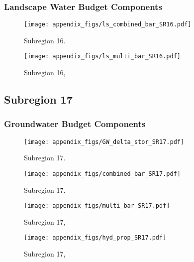 \subsubsection{Landscape Water Budget Components}
\begin{figure}[ht]
\centerline{\texttt{[image: appendix\_figs/ls\_combined\_bar\_SR16.pdf]}}
\caption{\LSCombinedTextOne Subregion 16.\LSCombinedTextTwo}
\label{fig:LS_budget_SR16}
\end{figure}
\newpage

\begin{landscape}
\begin{figure}[ht]
\centerline{\texttt{[image: appendix\_figs/ls\_multi\_bar\_SR16.pdf]}}
\caption{\LSMultiTextOne Subregion 16,\LSMultiTextTwo}
\label{fig:multi_LS_budget_SR16}
\end{figure}
\newpage
\end{landscape}

\subsection{Subregion 17}
\subsubsection{Groundwater Budget Components}
\begin{figure}[h]
\centerline{\texttt{[image: appendix\_figs/GW\_delta\_stor\_SR17.pdf]}}
\caption{\GWBudgetText Subregion 17.}
\label{fig:delta_stor_SR17}
\end{figure}
\newpage

\begin{figure}[ht]
\centerline{\texttt{[image: appendix\_figs/combined\_bar\_SR17.pdf]}}
\caption{\GWCombinedTextOne Subregion 17.\GWCombinedTextTwo}
\label{fig:GW_budget_SR17}
\end{figure}
\newpage

\begin{landscape}
\begin{figure}[ht]
\centerline{\texttt{[image: appendix\_figs/multi\_bar\_SR17.pdf]}}
\caption{\GWMultiTextOne Subregion 17,\GWMultiTextTwo}
\label{fig:multi_GW_budget_SR17}
\end{figure}
\newpage

\begin{figure}[ht]
\centerline{\texttt{[image: appendix\_figs/hyd\_prop\_SR17.pdf]}}
\caption{\HydPropOne Subregion 17,\HydPropTwo}
\label{fig:hyd_prop_SR17}
\end{figure}
\newpage
\end{landscape}

